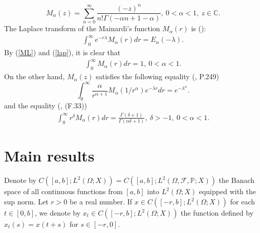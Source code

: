 \documentclass[12pt,a4paper,oneside,reqno,notitlepage]{amsart}
\theoremstyle{plain}
\numberwithin{equation}{section}
\begin{document}
\begin{equation}\label{rep2}
M_{\alpha}(z)=\sum_{n=0}^{\infty}\frac{(-z)^{n}}{n!\Gamma(-\alpha n+1-\alpha)},\ 0<\alpha<1,\ z\in \mathbb{C}.
\end{equation}
The Laplace transform of the Mainardi's function $M_{\alpha}(r)$ is (\cite{Main}):
\begin{align}\label{lap}
\int_{0}^{\infty}e^{-r\lambda}M_{\alpha}(r)dr=E_{\alpha}(-\lambda).
\end{align}
By (\ref{ML}) and (\ref{lap}), it is clear that
\begin{align}\label{one}
\int_{0}^{\infty}M_{\alpha}(r)dr=1,\ 0<\alpha<1.
\end{align}
On the other hand,
$M_{\alpha}(z)$ satisfies
the following equality (\cite{Main}, P.249)
\begin{equation}\label{L}
\int_{0}^{\infty}\frac{\alpha}{r^{\alpha+1}}M_{\alpha}(1/r^{\alpha})e^{-\lambda r}dr=e^{-\lambda^{\alpha}}.
\end{equation}
and the equality (\cite{Main}, (F.33))
\begin{align}\label{rm}
\int_{0}^{\infty}r^{\delta}M_{\alpha}(r)dr=\frac{\Gamma(\delta+1)}{\Gamma(\alpha\delta+1)}, \ \delta>-1,\ 0< \alpha<1.
\end{align}






\section{Main results}
Denote by $C([a,b]; L^{2}(\Omega;X))=C([a,b]; L^{2}(\Omega,\mathcal{F},\mathbb{P};X))$ the Banach space of all continuous functions from $[a,b]$ into $L^{2}(\Omega;X)$
equipped with the sup norm. Let $r>0$ be a real number. If $x\in C([-r,b];L^{2}(\Omega;X))$ for each $t\in [0,b]$, we denote by $x_{t}\in C([-r,b];L^{2}(\Omega;X))$ the function defined by $x_{t}(s)=x(t+s)$ for $s\in [-r,0]$.
\end{document}
